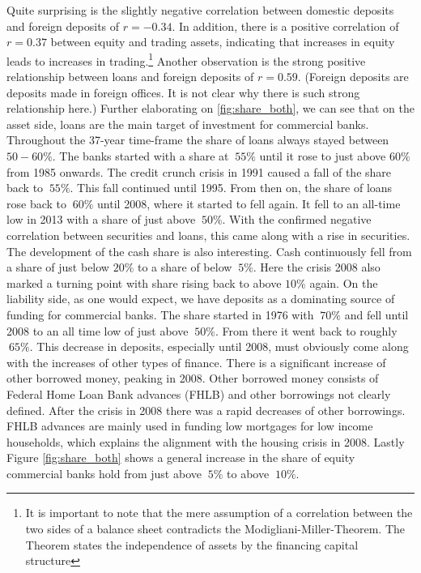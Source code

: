 \documentclass[12pt, a4paper]{article} %
\begin{document}
Quite surprising is the slightly negative correlation between domestic deposits and foreign deposits of $r=-0.34$.
In addition, there is a positive correlation of $r=0.37$ between equity and trading assets, indicating that increases in equity leads to increases in trading.\footnote{It is important to note that the mere assumption of a correlation between the two sides of a balance sheet contradicts the Modigliani-Miller-Theorem. The Theorem states the independence of assets by the financing capital structure}
Another observation is the strong positive relationship between loans and foreign deposits of $r=0.59$. (Foreign deposits are deposits made in foreign offices. It is not clear why there is such strong relationship here.)
Further elaborating on \ref{fig:share_both}, we can see that on the asset side, loans are the main target of investment for commercial banks. Throughout the 37-year time-frame the share of loans always stayed between $50-60\%$. The banks started with a share at $~55\%$ until it rose to just above $60\%$ from 1985 onwards. The credit crunch crisis in 1991 caused a fall of the share back to $~55\%$. This fall continued until 1995. From then on, the share of loans rose back to $~60\%$ until 2008, where it started to fell again. It fell to an all-time low in 2013 with a share of just above $~50\%$. With the confirmed negative correlation between securities and loans, this came along with a rise in securities. 
The development of the cash share is also interesting. Cash continuously fell from a share of just below $20\%$ to a share of below $~5\%$. Here the crisis 2008 also marked a turning point with share rising back to above $10\%$ again. 
On the liability side, as one would expect, we have deposits as a dominating source of funding for commercial banks. The share started in 1976 with $~70\%$ and fell until 2008 to an all time low of just above $~50\%$. From there it went back to roughly $~65\%$. This decrease in deposits, especially until 2008, must obviously come along with the increases of other types of finance. There is a significant increase of other borrowed money, peaking in 2008. Other borrowed money consists of Federal Home Loan Bank advances (FHLB) and other borrowings not clearly defined. After the crisis in 2008 there was a rapid decreases of other borrowings. FHLB advances are mainly used in funding low mortgages for low income households, which explains the alignment with the housing crisis in 2008.  Lastly Figure \ref{fig:share_both} shows a general increase in the share of equity commercial banks hold from just above $~5\%$ to above $~10\%$. 
 
\end{document}

